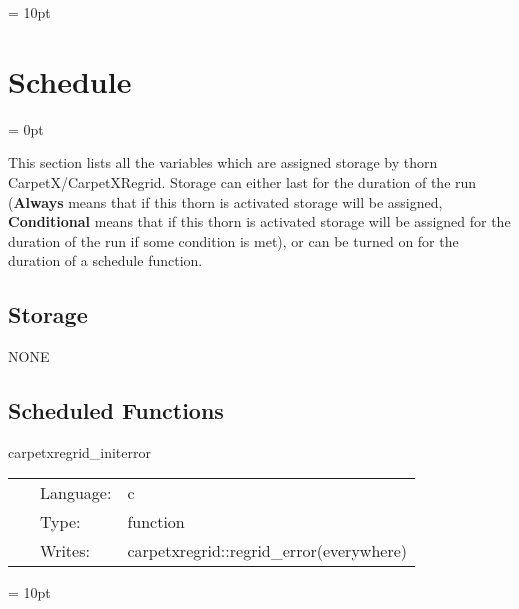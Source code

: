 \vspace{5mm}\parskip = 10pt 

\section{Schedule} 


\parskip = 0pt


\noindent This section lists all the variables which are assigned storage by thorn CarpetX/CarpetXRegrid.  Storage can either last for the duration of the run ({\bf Always} means that if this thorn is activated storage will be assigned, {\bf Conditional} means that if this thorn is activated storage will be assigned for the duration of the run if some condition is met), or can be turned on for the duration of a schedule function.


\subsection*{Storage}NONE
\subsection*{Scheduled Functions}
\vspace{5mm}


\hspace{5mm} carpetxregrid\_initerror 

\hspace{5mm}{\it initialize regridding error to zero } 


\hspace{5mm}

 \begin{tabular*}{160mm}{cll} 
~ & Language:  & c \\ 
~ & Type:  & function \\ 
~ & Writes:  & carpetxregrid::regrid\_error(everywhere) \\ 
\end{tabular*} 



\vspace{5mm}\parskip = 10pt 

